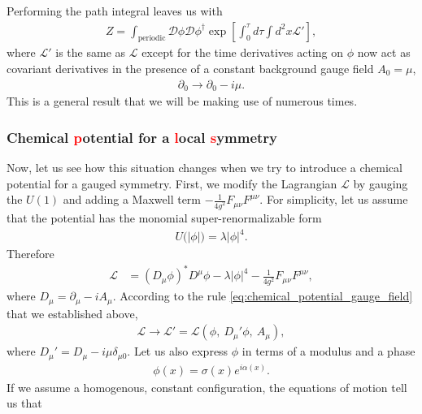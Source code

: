         Performing the path integral leaves us with
        \begin{align}
            Z= \int_{\text{periodic}} \mathcal{D}\phi \mathcal{D}\phi^{\dag} \exp \left[\int_0^{\tau} d\tau \int d^2x \mathcal{L'} \right],
        \end{align}
        where $\mathcal{L'}$ is the same as $\mathcal{L}$ except for the time derivatives acting on $\phi$ now act as covariant derivatives in the presence of a constant background gauge field $A_0=\mu$, \ie
        \begin{align}
            \partial_0 \rightarrow \partial_0 -i \mu. \label{eq:chemical_potential_gauge_field}
        \end{align}
        This is a general result that we will be making use of numerous times.
        \subsubsection{Chemical \textcolor{red}{p}otential for a \textcolor{red}{l}ocal \textcolor{red}{s}ymmetry}
        Now, let us see how this situation changes when we try to introduce a chemical potential for a gauged symmetry. First, we modify the Lagrangian $\mathcal{L}$ by gauging the $U(1)$ and adding a Maxwell term $-\frac{1}{4 g^2} F_{\mu \nu} F^{\mu \nu}$. For simplicity, let us assume that the potential has the monomial super-renormalizable form
        \begin{align}
            U\big(|\phi| \big) = \lambda |\phi|^4.
        \end{align}
        Therefore
        \begin{align}
            \mathcal{L} &=( D_{\mu} \phi)^* D^{\mu} \phi - \lambda |\phi|^4 - \frac{1}{4 g^2}F_{\mu \nu} F^{\mu \nu},
        \end{align}
        where $D_{\mu}= \partial_{\mu} - i A_{\mu}$. According to the rule \ref{eq:chemical_potential_gauge_field} that we established above,
        \begin{align}
            \mathcal{L} \rightarrow \mathcal{L}'= \mathcal{L}\left(\phi,\ D_{\mu}' \phi,\ A_{\mu} \right),
        \end{align}
        where $D_{\mu}' = D_{\mu} - i \mu \delta_{\mu 0}$.
        Let us also express $\phi$ in terms of a modulus and a phase
        \begin{align}
            \phi(x) = \sigma(x) e^{i \alpha(x)}.
        \end{align}
        If we assume a homogenous, constant configuration, the equations of motion tell us that
